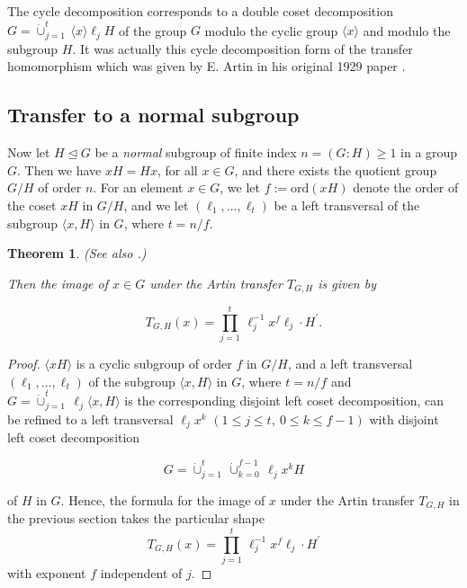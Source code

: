 \documentclass{amsart}
\newtheorem{theorem}{Theorem}[section]
\theoremstyle{definition}
\numberwithin{equation}{section}
\begin{document}
The cycle decomposition corresponds to a
double coset decomposition \(G=\dot{\cup}_{j=1}^t\,\langle x\rangle \ell_jH\) of the group \(G\)
modulo the cyclic group \(\langle x\rangle\) and modulo the subgroup \(H\).
It was actually this cycle decomposition form of the transfer homomorphism
which was given by E. Artin in his original 1929 paper
\cite[\S 2, p.50]{Ar2}.



\subsection{Transfer to a normal subgroup}
\label{ss:NrmSbg}

Now let \(H\unlhd G\) be a \textit{normal} subgroup of finite index \(n=(G:H)\ge 1\) in a group \(G\).
Then we have \(xH=Hx\), for all \(x\in G\), and there exists the quotient group \(G/H\) of order \(n\).
For an element \(x\in G\), we let \(f:=\mathrm{ord}(xH)\) denote the order of the coset \(xH\) in \(G/H\),
and we let \((\ell_1,\ldots,\ell_t)\) be a left transversal of the subgroup \(\langle x,H\rangle\) in \(G\),
where \(t=n/f\).

\begin{theorem}
\label{thm:NrmSbg}
(See also \cite[\S 27.4, VII, p.171]{Ha}.)

Then the image of \(x\in G\) under the Artin transfer \(T_{G,H}\) is given by

\begin{equation}
\label{eqn:TransferToNormalSbg}
T_{G,H}(x)=\prod_{j=1}^t\,\ell_j^{-1}x^f\ell_j\cdot H^\prime.
\end{equation}

\end{theorem}

\begin{proof}
\(\langle xH\rangle\) is a cyclic subgroup of order \(f\) in \(G/H\),
and a left transversal \((\ell_1,\ldots,\ell_t)\) of the subgroup \(\langle x,H\rangle\) in \(G\),
where \(t=n/f\) and
\(G=\dot{\cup}_{j=1}^t\,\ell_j\langle x,H\rangle\) is the corresponding disjoint left coset decomposition,
can be refined to a left transversal
\(\ell_jx^k\) \((1\le j\le t,\ 0\le k\le f-1)\)
with  disjoint left coset decomposition

\begin{equation}
\label{eqn:LeftTransvOfNormalSbg}
G=\dot{\cup}_{j=1}^t\,\dot{\cup}_{k=0}^{f-1}\,\ell_jx^kH
\end{equation}

\noindent
of \(H\) in \(G\).
Hence, the formula for the image of \(x\) under the Artin transfer \(T_{G,H}\) in the previous section
takes the particular shape
\[T_{G,H}(x)=\prod_{j=1}^t\,\ell_j^{-1}x^f\ell_j\cdot H^\prime\]
with exponent \(f\) independent of \(j\).
\end{proof}
\end{document}
